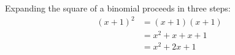 \documentclass{article}
\begin{document}
Expanding the square of a binomial proceeds in three steps:
\begin{align*}
  (x+1)^2 &= (x+1)(x+1) \\
          &= x^2 + x + x + 1 \\
          &= x^2 + 2x + 1
\end{align*}
\end{document}
